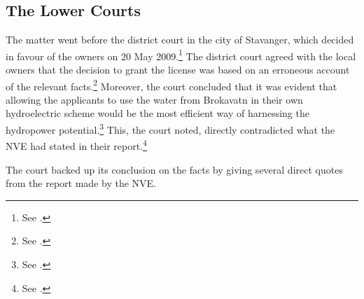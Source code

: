 \subsection{The Lower Courts}

The matter went before the district court in the city of Stavanger, which decided in favour of the owners on 20 May 2009.\footnote{See \cite{jorpeland09}.} The district court agreed with the local  owners that the decision to grant the license was based on an erroneous account of the relevant facts.\footnote{See \cite[25]{jorpeland11}.} Moreover, the court concluded that it was evident that allowing the applicants to use the water from Brokavatn in their own hydroelectric scheme would be the most efficient way of harnessing the hydropower potential.\footnote{See \cite[22-23]{jorpeland09}.} This, the court noted, directly contradicted what the NVE had stated in their report.\footnote{See \cite[23]{jorpeland09}.}

The court backed up its conclusion on the facts by giving several direct quotes from the report made by the NVE. %


